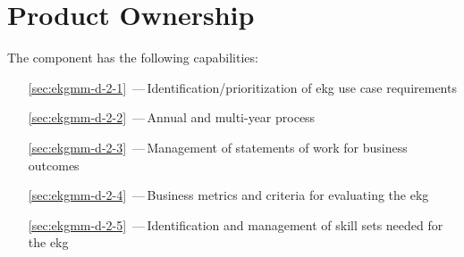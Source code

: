 \chapter{Product Ownership}\label{ch:ekg-mm-d-2}

The  component has the following capabilities:

\begin{itemize}[leftmargin=.5in]
  \item [\ref{sec:ekgmm-d-2-1}] \,---\,Identification/prioritization of \gls{ekg} use case requirements
  \item [\ref{sec:ekgmm-d-2-2}] \,---\,Annual and multi-year  process
  \item [\ref{sec:ekgmm-d-2-3}] \,---\,Management of statements of work
  for business outcomes
  \item [\ref{sec:ekgmm-d-2-4}] \,---\,Business metrics and criteria for evaluating the \gls{ekg}
  \item [\ref{sec:ekgmm-d-2-5}] \,---\,Identification and management of skill sets
  needed for the \gls{ekg}
\end{itemize}






